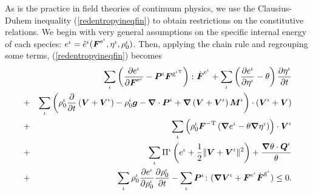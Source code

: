 As is the practice in field theories of continuum physics, we use
the Clausius-Duhem inequality (\ref{redentropyineqfin}) to obtain
restrictions on the constitutive relations. We begin with very
general assumptions on the specific internal energy of each
species: $ e^\iota = \hat{e}^\iota(\mbox{\boldmath$ F$}^{\mathrm{e}^\iota},
\eta^\iota, \rho_0^\iota)$. Then, applying the chain rule and
regrouping some terms, (\ref{redentropyineqfin}) becomes
\begin{eqnarray}
& &\sum\limits_{\iota}\left(\frac{\partial
e^\iota}{\partial\mbox{\boldmath$ F$}^{\mathrm{e}^\iota}}-\mbox{\boldmath$ P$}^\iota\mbox{\boldmath$ F$}^{\mathrm{g}^{\iota\mathrm{T}}}\right)\colon\dot{\mbox{\boldmath$ F$}}^{\mathrm{e}^\iota}
+ \sum\limits_{\iota}\left(\frac{\partial e^\iota}{\partial
\eta^\iota}-\theta\right)\frac{\partial\eta^\iota}{\partial t}\nonumber\\
&+&\sum\limits_{\iota} \left(\rho^\iota_0\frac{\partial}{\partial
t}\left(\mbox{\boldmath$ V$}+\mbox{\boldmath$ V$}^\iota\right) - \rho_0^\iota\mbox{\boldmath$ g$} -
\mbox{\boldmath$\nabla$}\cdot\mbox{\boldmath$ P$}^\iota +
\mbox{\boldmath$\nabla$}\left(\mbox{\boldmath$ V$}+\mbox{\boldmath$ V$}^\iota\right)\mbox{\boldmath$ M$}^\iota\right)\cdot(\mbox{\boldmath$ V$}^\iota+\mbox{\boldmath$ V$})\nonumber\\
&+&\sum\limits_{\iota}\left(\rho^\iota_0\mbox{\boldmath$ F$}^{-\mathrm{T}}\left(\mbox{\boldmath$\nabla$}
e^\iota -
\theta\mbox{\boldmath$\nabla$}\eta^\iota\right)\right)\cdot\mbox{\boldmath$ V$}^\iota\nonumber\\
&+&\sum\limits_{\iota}\Pi^\iota\left(e^\iota +
\frac{1}{2}\Vert\mbox{\boldmath$ V$}+\mbox{\boldmath$ V$}^\iota\Vert^2\right) +
\frac{\mbox{\boldmath$\nabla$}\theta\cdot\mbox{\boldmath$ Q$}^\iota}{\theta}\nonumber\\
&+& \sum\limits_{\iota}\rho^\iota_0\frac{\partial
e^\iota}{\partial\rho^\iota_0}\frac{\partial
\rho^\iota_0}{\partial t} -
\sum\limits_{\iota}\mbox{\boldmath$ P$}^\iota\colon(\mbox{\boldmath$\nabla$}\mbox{\boldmath$ V$}^\iota +
\mbox{\boldmath$ F$}^{\mathrm{e}^\iota}\dot{\mbox{\boldmath$ F$}}^{\mathrm{g}^\iota}) \leq 0.
\label{redentropyineq1}
\end{eqnarray}

